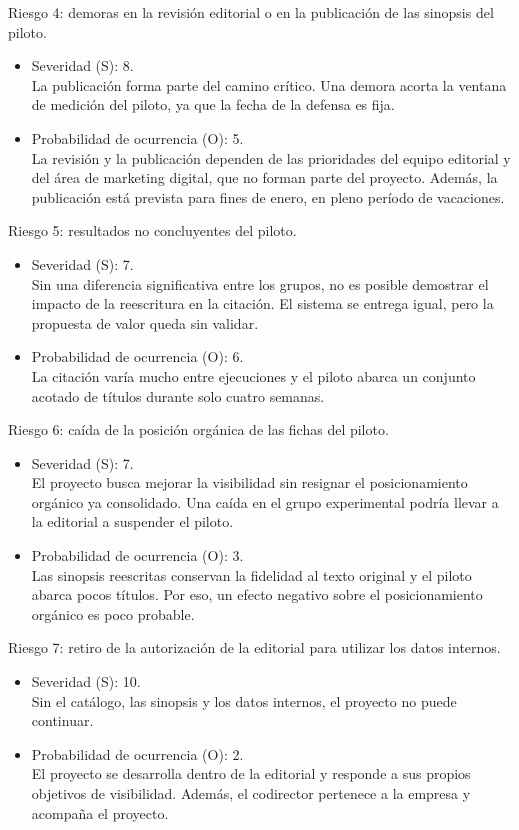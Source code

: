 \documentclass[
11pt, %
codirector, %
]{charter}
\begin{document}
Riesgo 4: demoras en la revisión editorial o en la publicación de las sinopsis del piloto.
\begin{itemize}
	\item Severidad (S): 8.\\
	La publicación forma parte del camino crítico. Una demora acorta la ventana de medición del piloto, ya que la fecha de la defensa es fija.
	\item Probabilidad de ocurrencia (O): 5.\\
	La revisión y la publicación dependen de las prioridades del equipo editorial y del área de marketing digital, que no forman parte del proyecto. Además, la publicación está prevista para fines de enero, en pleno período de vacaciones.
\end{itemize}

Riesgo 5: resultados no concluyentes del piloto.
\begin{itemize}
	\item Severidad (S): 7.\\
	Sin una diferencia significativa entre los grupos, no es posible demostrar el impacto de la reescritura en la citación. El sistema se entrega igual, pero la propuesta de valor queda sin validar.
	\item Probabilidad de ocurrencia (O): 6.\\
	La citación varía mucho entre ejecuciones y el piloto abarca un conjunto acotado de títulos durante solo cuatro semanas.
\end{itemize}

Riesgo 6: caída de la posición orgánica de las fichas del piloto.
\begin{itemize}
	\item Severidad (S): 7.\\
	El proyecto busca mejorar la visibilidad sin resignar el posicionamiento orgánico ya consolidado. Una caída en el grupo experimental podría llevar a la editorial a suspender el piloto.
	\item Probabilidad de ocurrencia (O): 3.\\
	Las sinopsis reescritas conservan la fidelidad al texto original y el piloto abarca pocos títulos. Por eso, un efecto negativo sobre el posicionamiento orgánico es poco probable.
\end{itemize}

Riesgo 7: retiro de la autorización de la editorial para utilizar los datos internos.
\begin{itemize}
	\item Severidad (S): 10.\\
	Sin el catálogo, las sinopsis y los datos internos, el proyecto no puede continuar.
	\item Probabilidad de ocurrencia (O): 2.\\
	El proyecto se desarrolla dentro de la editorial y responde a sus propios objetivos de visibilidad. Además, el codirector pertenece a la empresa y acompaña el proyecto.
\end{itemize}
\end{document}
